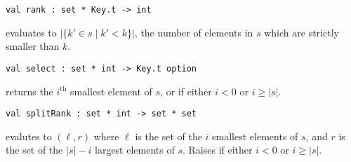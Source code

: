 \begin{cluster}
\label{grp:grm:ordset-interface::rank}

\begin{gram}[rank]
\label{grm:ordset-interface::rank}
\begin{verbatim}
val rank : set * Key.t -> int
\end{verbatim}
 evaluates to $\left| \{ k' \in s \mathbin| k' < k \}\right|$,
the number of elements in $s$ which are strictly smaller than $k$.

\end{gram}
\end{cluster}

\begin{cluster}
\label{grp:grm:ordset-interface::select}

\begin{gram}[select]
\label{grm:ordset-interface::select}
\begin{verbatim}
val select : set * int -> Key.t option
\end{verbatim}
 returns the $i^\text{th}$ smallest element of $s$, or
 if either $i < 0$ or $i \geq |s|$.

\end{gram}
\end{cluster}

\begin{cluster}
\label{grp:grm:ordset-interface::splitrank}

\begin{gram}[splitRank]
\label{grm:ordset-interface::splitrank}
\begin{verbatim}
val splitRank : set * int -> set * set
\end{verbatim}
 evalutes to $(\ell,r)$ where $\ell$ is the set of the
$i$ smallest elements of $s$, and $r$ is the set of the $|s|-i$ largest
elements of $s$. Raises  if either $i < 0$ or $i \geq |s|$.

\end{gram}
\end{cluster}

